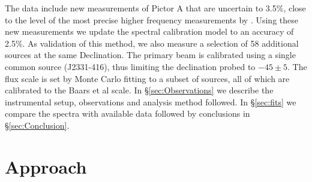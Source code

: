 \documentclass[preprint]{aastex}
\begin{document}
The data  include new measurements of Pictor A that are uncertain to 3.5\%,
close to the level of the most precise higher frequency measurements by
\citet{Wills:1975p9314}. Using these new measurements we update the spectral
calibration model to an accuracy of 2.5\%. As validation of this method, we
also measure a selection of 58 additional sources at the same Declination.  The
primary beam is calibrated using a single common source (J2331-416), thus
limiting the declination probed to $-45 \pm 5$\arcdeg.  The flux scale is set
by Monte Carlo fitting to a subset of sources, all of which are calibrated to
the Baars et al scale. In \S\ref{sec:Observations} we describe the instrumental
setup, observations and analysis method followed. In \S\ref{sec:fits} we
compare the spectra with available data followed by conclusions in
\S\ref{sec:Conclusion}.


\section{Approach}



\end{document}
